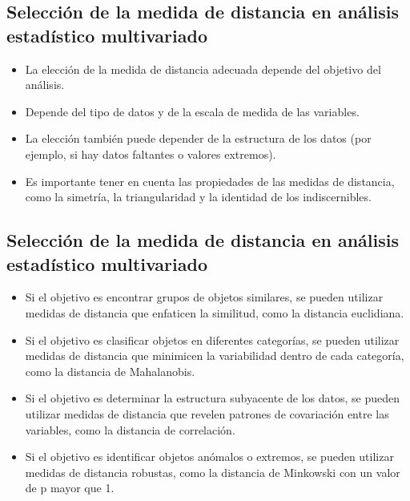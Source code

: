 \documentclass[
]{article}
\providecommand{\tightlist}{%
  \setlength{\itemsep}{0pt}\setlength{\parskip}{0pt}}
\begin{document}
\hypertarget{selecciuxf3n-de-la-medida-de-distancia-en-anuxe1lisis-estaduxedstico-multivariado}{%
\subsection{Selección de la medida de distancia en análisis estadístico
multivariado}\label{selecciuxf3n-de-la-medida-de-distancia-en-anuxe1lisis-estaduxedstico-multivariado}}

\begin{itemize}
\tightlist
\item
  La elección de la medida de distancia adecuada depende del objetivo
  del análisis.
\item
  Depende del tipo de datos y de la escala de medida de las variables.
\item
  La elección también puede depender de la estructura de los datos (por
  ejemplo, si hay datos faltantes o valores extremos).
\item
  Es importante tener en cuenta las propiedades de las medidas de
  distancia, como la simetría, la triangularidad y la identidad de los
  indiscernibles.
\end{itemize}

\hypertarget{selecciuxf3n-de-la-medida-de-distancia-en-anuxe1lisis-estaduxedstico-multivariado-1}{%
\subsection{Selección de la medida de distancia en análisis estadístico
multivariado}\label{selecciuxf3n-de-la-medida-de-distancia-en-anuxe1lisis-estaduxedstico-multivariado-1}}

\begin{itemize}
\tightlist
\item
  Si el objetivo es encontrar grupos de objetos similares, se pueden
  utilizar medidas de distancia que enfaticen la similitud, como la
  distancia euclidiana.
\item
  Si el objetivo es clasificar objetos en diferentes categorías, se
  pueden utilizar medidas de distancia que minimicen la variabilidad
  dentro de cada categoría, como la distancia de Mahalanobis.
\item
  Si el objetivo es determinar la estructura subyacente de los datos, se
  pueden utilizar medidas de distancia que revelen patrones de
  covariación entre las variables, como la distancia de correlación.
\item
  Si el objetivo es identificar objetos anómalos o extremos, se pueden
  utilizar medidas de distancia robustas, como la distancia de Minkowski
  con un valor de p mayor que 1.
\end{itemize}
\end{document}
